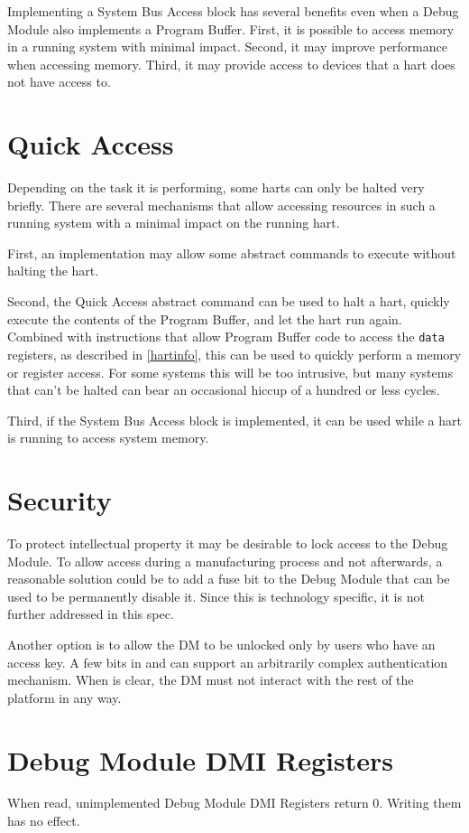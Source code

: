 \begin{commentary}
Implementing a System Bus Access block has several benefits even
when a Debug Module also implements a Program Buffer. 
First, it is possible to
access memory in a running system with minimal impact.  Second, it may improve
performance when accessing memory.
Third, it may provide
access to devices that a hart does not have access to.
\end{commentary}

\section{Quick Access}

Depending on the task it is performing, some harts can only be halted very briefly.
There are several mechanisms that allow accessing resources in such a running system
with a minimal impact on the running hart.

First, an implementation may allow some abstract commands to execute without halting the hart.

Second, the Quick Access abstract command can be used to halt a hart, quickly
execute the contents of the Program Buffer, and let the hart run again.
Combined with instructions that allow Program Buffer code to access the
{\tt data} registers, as described in \ref{hartinfo}, this can be used to quickly
perform a memory or register access. For some systems this will be too
intrusive, but many systems that can't be halted can bear an occasional hiccup
of a hundred or less cycles.

Third, if the System Bus Access block is implemented, it can be used while a
hart is running to access system memory.

\section{Security}

To protect intellectual property it may be desirable to lock access to the
Debug Module.  To allow access during a manufacturing process and not
afterwards, a reasonable solution could be to add a fuse bit to the Debug
Module that can be used to be permanently disable it. Since this is technology
specific, it is not further addressed in this spec.

Another option is to allow the DM to be unlocked only by users who have an
access key. A few bits in \Rdmstatus and \Rauthdata can support an arbitrarily
complex authentication mechanism.  When \Fauthenticated is clear, the DM must
not interact with the rest of the platform in any way.

\section{Debug Module DMI Registers} \label{dmdebbus}

When read, unimplemented Debug Module DMI Registers return 0. Writing them has
no effect.


